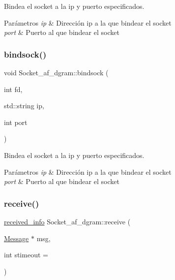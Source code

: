 Bindea el socket a la ip y puerto especificados. 


\begin{DoxyParams}{Parámetros}
{\em ip} & Dirección ip a la que bindear el socket \\
\hline
{\em port} & Puerto al que bindear el socket \\
\hline
\end{DoxyParams}
\mbox{\label{classSocket__af__dgram_a6a2084d50ab117b0bf6b699aa0573db5}} 
\subsubsection{\texorpdfstring{bindsock()}{bindsock()}\hspace{0.1cm}{\footnotesize\ttfamily [2/2]}}
{\footnotesize\ttfamily void Socket\+\_\+af\+\_\+dgram\+::bindsock (\begin{DoxyParamCaption}\item[{int}]{fd,  }\item[{std\+::string}]{ip,  }\item[{int}]{port }\end{DoxyParamCaption})}



Bindea el socket a la ip y puerto especificados. 


\begin{DoxyParams}{Parámetros}
{\em ip} & Dirección ip a la que bindear el socket \\
\hline
{\em port} & Puerto al que bindear el socket \\
\hline
\end{DoxyParams}
\mbox{\label{classSocket__af__dgram_ac7d122d2317d980c48964076c3c7e2bb}} 
\subsubsection{\texorpdfstring{receive()}{receive()}\hspace{0.1cm}{\footnotesize\ttfamily [1/2]}}
{\footnotesize\ttfamily \hyperlink{structreceived__info}{received\+\_\+info} Socket\+\_\+af\+\_\+dgram\+::receive (\begin{DoxyParamCaption}\item[{\hyperlink{structMessage}{Message} $\ast$}]{msg,  }\item[{int}]{stimeout = {} }\end{DoxyParamCaption})}



